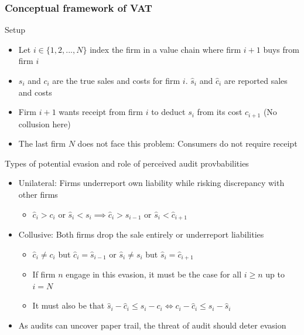 \documentclass[aspectratio=169]{beamer}
\begin{document}
\begin{frame}
\frametitle{Conceptual framework of VAT} 
Setup
\begin{itemize}\setlength\itemsep{3pt}
\item Let $i\in\{1,2,...,N\}$ index the firm in a value chain where firm $i+1$ buys from firm $i$
\item $s_i$ and $c_i$ are the true sales and costs for firm $i$. $\widehat{s}_i$ and $\widehat{c}_i$ are reported sales and costs
\item Firm $i+1$ wants receipt from firm $i$ to deduct $s_i$ from its cost $c_{i+1}$ (No collusion here)
\item The last firm $N$ does not face this problem: Consumers do not require receipt
\end{itemize}\medskip
Types of potential evasion and role of perceived audit provbabilities
\begin{itemize}\setlength\itemsep{3pt}
  \item Unilateral: Firms underreport own liability while risking discrepancy with other firms
  \begin{itemize}\setlength\itemsep{3pt}
    \item $\widehat{c}_i>c_i$ or $\widehat{s}_i<s_i\implies\widehat{c}_i>\widehat{s}_{i-1}$ or $\widehat{s}_i < \widehat{c}_{i+1}$ 
  \end{itemize}
  \item Collusive: Both firms drop the sale entirely or underreport liabilities 
  \begin{itemize}\setlength\itemsep{3pt}
    \item $\widehat{c}_i \neq c_i$ but $\widehat{c}_i=\widehat{s}_{i-1}$ or $\widehat{s}_i \neq s_i$ but $\widehat{s}_i = \widehat{c}_{i+1}$ 
    \item If firm $n$ engage in this evasion, it must be the case for all $i\geq n$ up to $i=N$ 
    \item It must also be that $\widehat{s}_i-\widehat{c}_i \leq s_i-c_i \iff c_i-\widehat{c}_i \leq s_i - \widehat{s}_i$
  \end{itemize}
  \item As audits can uncover paper trail, the threat of audit should deter evasion
\end{itemize}
\end{frame}
\end{document}

